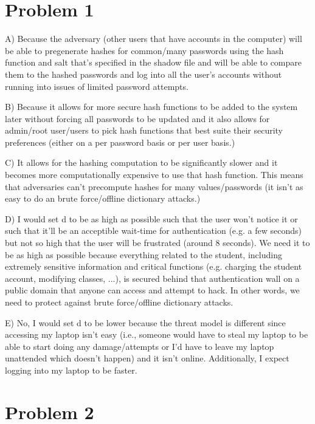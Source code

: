 \documentclass{6160}
\author{Jennifer Fairhurst}
\begin{document}
\section*{Problem 1}

A) Because the adversary (other users that have accounts in the computer) 
will be able to pregenerate hashes for common/many passwords using the hash
function and salt that's specified in the shadow file
and will be able to compare them to the hashed passwords and log into all the 
user's accounts without running into issues of limited password attempts.

B) Because it allows for more secure hash functions to be added to the system later
without forcing all passwords to be updated and it also allows for 
admin/root user/users to pick hash functions that best suite their security 
preferences (either on a per password basis or per user basis.) 

C) It allows for the hashing computation to be significantly slower and it becomes
more computationally expensive to use that hash function. This means that
adversaries can't precompute hashes for many values/passwords (it isn't as easy to do
an brute force/offline dictionary attacks.)

D) I would set d to be as high as possible such that the user won't notice it or such
that it'll be an acceptible wait-time for authentication (e.g. a few seconds) but not
so high that the user will be frustrated (around 8 seconds). We need 
it to be as high as possible because everything related to the student, including extremely
sensitive information and critical functions (e.g. charging the student account, modifying
classes, ...), is secured behind that authentication wall on a public domain that anyone
can access and attempt to hack. In other words, we need to protect against 
brute force/offline dictionary attacks.

E) No, I would set d to be lower because the threat model is different since
accessing my laptop isn't easy (i.e., someone would have to steal my laptop to be 
able to start doing any damage/attempts or I'd have to leave my laptop unattended 
which doesn't happen) and it isn't online. Additionally, I expect logging 
into my laptop to be faster.

\newpage
\section*{Problem 2}
\end{document}
